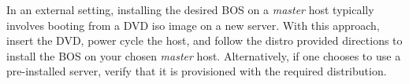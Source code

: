 In an external setting, installing the desired BOS on a {\em master} host 
typically involves booting from a DVD iso image on a new server. With this 
approach, insert the \baseOS{} DVD, power cycle the host, and follow the 
distro provided directions to install the BOS on your chosen {\em master} host. 
Alternatively, if one chooses to use a pre-installed server, verify that it is 
provisioned with the required \baseOS{} distribution.

